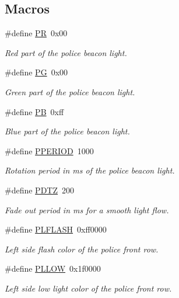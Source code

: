 \subsection*{Macros}
\begin{DoxyCompactItemize}
\item 
\#define \hyperlink{group__police_ga088f4c3612d1ab1c9f6f139234ae533b}{PR}~0x00
\begin{DoxyCompactList}\small\item\em Red part of the police beacon light. \end{DoxyCompactList}\item 
\#define \hyperlink{group__police_ga037f1be1c3e45bf4d0d4f5ddc159ff30}{PG}~0x00
\begin{DoxyCompactList}\small\item\em Green part of the police beacon light. \end{DoxyCompactList}\item 
\#define \hyperlink{group__police_ga2a06f3773d46878dc58f8dadd6fd0d72}{PB}~0xff
\begin{DoxyCompactList}\small\item\em Blue part of the police beacon light. \end{DoxyCompactList}\item 
\#define \hyperlink{group__police_gaa5b3f73b18472f543c080194bf9c2e79}{P\+P\+E\+R\+I\+OD}~1000
\begin{DoxyCompactList}\small\item\em Rotation period in ms of the police beacon light. \end{DoxyCompactList}\item 
\#define \hyperlink{group__police_ga2b9a2b71c1aa4f1c059461e2db7edf44}{P\+D\+TZ}~200
\begin{DoxyCompactList}\small\item\em Fade out period in ms for a smooth light flow. \end{DoxyCompactList}\item 
\#define \hyperlink{group__police_ga6204e236d3e4ef0beb5b6fd976fecf43}{P\+L\+F\+L\+A\+SH}~0xff0000
\begin{DoxyCompactList}\small\item\em Left side flash color of the police front row. \end{DoxyCompactList}\item 
\#define \hyperlink{group__police_ga98673c164f8917ff7af0016ba30e7ca8}{P\+L\+L\+OW}~0x1f0000
\begin{DoxyCompactList}\small\item\em Left side low light color of the police front row. \end{DoxyCompactList}\item 

\end{DoxyCompactItemize}
